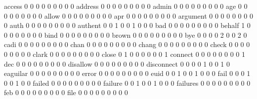 \documentclass[compress,8pt]{beamer}
\begin{document}
\begin{frame}
\begin{Schunk}
  access                                     0   0   0   0   0   0   0   0   0
  address                                    0   0   0   0   0   0   0   0   0
  admin                                      0   0   0   0   0   0   0   0   0
  age                                        0   0   0   0   0   0   0   0   0
  allow                                      0   0   0   0   0   0   0   0   0
  apr                                        0   0   0   0   0   0   0   0   0
  argument                                   0   0   0   0   0   0   0   0   0
  auth                                       0   0   0   0   0   0   0   0   0
  authent                                    0   0   1   0   0   1   0   0   0
  bad                                        0   0   0   0   0   0   0   0   0
  behalf                                     1   0   0   0   0   0   0   0   0
  bind                                       0   0   0   0   0   0   0   0   0
  brown                                      0   0   0   0   0   0   0   0   0
  bye                                        0   0   0   0   2   0   0   2   0
  cadi                                       0   0   0   0   0   0   0   0   0
  chan                                       0   0   0   0   0   0   0   0   0
  chang                                      0   0   0   0   0   0   0   0   0
  check                                      0   0   0   0   0   0   0   0   0
  clark                                      0   0   0   0   0   0   0   0   0
  close                                      0   1   0   0   0   0   0   0   1
  connect                                    0   0   0   0   0   0   0   0   1
  dec                                        0   0   0   0   0   0   0   0   0
  disallow                                   0   0   0   0   0   0   0   0   0
  disconnect                                 0   0   0   0   1   0   0   1   0
  eaguilar                                   0   0   0   0   0   0   0   0   0
  error                                      0   0   0   0   0   0   0   0   0
  euid                                       0   0   1   0   0   1   0   0   0
  fail                                       0   0   0   1   0   0   1   0   0
  failed                                     0   0   0   0   0   0   0   0   0
  failure                                    0   0   1   0   0   1   0   0   0
  failures                                   0   0   0   0   0   0   0   0   0
  feb                                        0   0   0   0   0   0   0   0   0
  file                                       0   0   0   0   0   0   0   0   0

\end{Schunk}
\end{frame}
\end{document}
